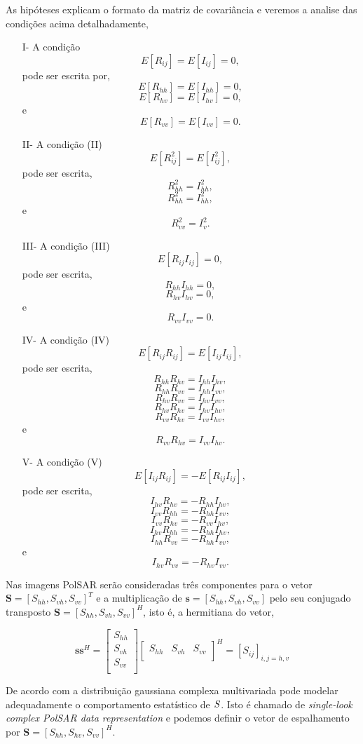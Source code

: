 \documentclass[conference]{IEEEtran}
\begin{document}
As hipóteses explicam o formato da matriz de covariância e veremos a analise das condições acima detalhadamente,
\begin{itemize}
	\item[I-] A condição $$E[R_{ij}]=E[I_{ij}]=0,$$ pode ser escrita por, 
	$$E[R_{hh}]=E[I_{hh}]=0,$$ 
	$$E[R_{hv}]=E[I_{hv}]=0,$$ 
  e $$E[R_{vv}]=E[I_{vv}]=0.$$	                               
	\item[II-] A condição (II) $$E[R_{ij}^2]=E[I_{ij}^2],$$ pode ser escrita,      $$R_{hh}^2=I_{hh}^2,$$ 
	$$R_{hh}^2=I_{hh}^2,$$ 
	e $$R_{vv}^2=I_{v}^2.$$
	\item[III-]A condição (III) $$E[R_{ij}I_{ij}]=0,$$ pode ser escrita, $$R_{hh}I_{hh}=0,
$$ $$R_{hv}I_{hv}=0,$$
e $$R_{vv}I_{vv}=0.$$ 
	\item[IV-] A condição (IV) $$E[R_{ij}R_{ij}]=E[I_{ij}I_{ij}],$$ pode ser escrita, $$R_{hh}R_{hv}=I_{hh}I_{hv},$$
	     $$R_{hh}R_{vv}=I_{hh}I_{vv},$$
	     $$R_{hv}R_{vv}=I_{hv}I_{vv},$$
	     $$R_{hv}R_{hv}=I_{hv}I_{hv},$$ 
	     $$R_{vv}R_{hv}=I_{vv}I_{hv},$$
	  e  $$R_{vv}R_{hv}=I_{vv}I_{hv}.$$ 
	\item[V-] A condição (V) 
	$$E[I_{ij}R_{ij}]=-E[R_{ij}I_{ij}],$$ pode ser escrita,
    $$I_{hv}R_{hv}=-R_{hh}I_{hv},$$
    $$I_{vv}R_{hh}=-R_{hh}I_{vv},$$
    $$I_{vv}R_{hv}=-R_{vv}I_{hv},$$
    $$I_{hv}R_{hh}=-R_{hh}I_{hv},$$
    $$I_{hh}R_{vv}=-R_{hh}I_{vv},$$
  e $$I_{hv}R_{vv}=-R_{hv}I_{vv}.$$ 
\end{itemize}

Nas imagens PolSAR serão consideradas três componentes para o vetor $\mathbf{S}=[S_{hh},S_{vh},S_{vv}]^T$ e a multiplicação de $\mathbf{s}=[S_{hh},S_{vh},S_{vv}]$ pelo seu conjugado transposto $\mathbf{S}=[S_{hh},S_{vh},S_{vv}]^H$, isto é, a hermitiana do vetor, 

\begin{equation}
\mathbf{s}\mathbf{s}^H = \left[
\begin{array}{c}
	S_{hh}      \\
        S_{vh}     \\
	S_{vv}      \\
\end{array}
\right]
\left[
\begin{array}{ccc}
	S_{hh}  & S_{vh}  & S_{vv}      \\
\end{array}
\right]^H = \left[S_{ij} \right]_{i,j=h,v}
\end{equation}

De acordo com \cite{good} a distribuição gaussiana complexa multivariada pode modelar adequadamente o comportamento estatístico de $\boldmath S$. Isto é chamado de {\it single-look complex PolSAR data representation} e podemos definir o vetor de espalhamento por $\mathbf{S}=[S_{hh},S_{hv},S_{vv}]^H$. 
\end{document}
